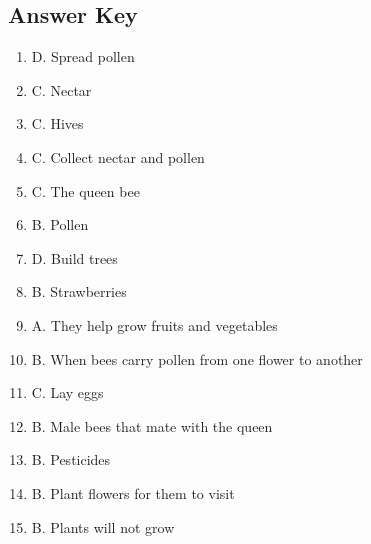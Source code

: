 \documentclass[12pt]{article}
\begin{document}
\begin{enumerate}
\newpage
\subsection*{Answer Key}

\begin{enumerate}
    \item D. Spread pollen
    \item C. Nectar
    \item C. Hives
    \item C. Collect nectar and pollen
    \item C. The queen bee
    \item B. Pollen
    \item D. Build trees
    \item B. Strawberries
    \item A. They help grow fruits and vegetables
    \item B. When bees carry pollen from one flower to another
    \item C. Lay eggs
    \item B. Male bees that mate with the queen
    \item B. Pesticides
    \item B. Plant flowers for them to visit
    \item B. Plants will not grow
\end{enumerate}

\end{enumerate}
\end{document}
